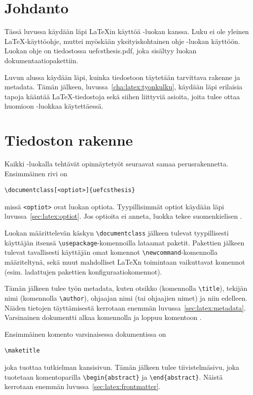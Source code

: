 
\chapter{Johdanto}
\label{cha:latex:johdanto}

Tässä luvussa käydään läpi \LaTeX{in} käyttöä \uefcsthesis-luokan kanssa. Luku ei ole yleinen \LaTeX-käyttöohje, muttei myöskään yksityiskohtainen ohje \uefcsthesis-luokan käyttöön. Luokan ohje on tiedostossa uefcsthesis.pdf, joka sisältyy luokan dokumentaatiopakettiin.

Luvun alussa käydään läpi, kuinka tiedostoon täytetään tarvittava rakenne ja metadata. Tämän jälkeen, luvussa~\ref{cha:latex:tyonkulku}, käydään läpi erilaisia tapoja kääntää \LaTeX-tiedostoja sekä siihen liittyviä asioita, joita tulee ottaa huomioon \uefcsthesis-luokkaa käytettäessä. 

\chapter{Tiedoston rakenne}
\label{cha:latex:rakenne}

Kaikki \uefcsthesis-luokalla tehtävät opinnäytetyöt seuraavat samaa perusrakennetta. Ensimmäinen rivi on 
\begin{verbatim}
\documentclass[<optiot>]{uefcsthesis}
\end{verbatim}
missä \verb|<optiot>| ovat luokan optiota. Tyypillisimmät optiot käydään läpi luvussa~\ref{sec:latex:optiot}. Jos optioita ei anneta, luokka tekee suomenkielisen . 

Luokan määrittelevän käskyn \verb|\documentclass| jälkeen tulevat tyypillisesti käyttäjän itsensä \verb|\usepackage|-komennoilla lataamat paketit. Pakettien jälkeen tulevat tavallisesti käyttäjän omat komennot \verb|\newcommand|-komennolla määriteltynä, sekä muut mahdolliset \LaTeX{n} toimintaan vaikuttavat komennot (esim. ladattujen pakettien konfiguraatiokomennot).

Tämän jälkeen tulee työn metadata, kuten otsikko (komennolla \verb|\title|), tekijän nimi (komennolla \verb|\author|), ohjaajan nimi (tai ohjaajien nimet) ja niin edelleen. Näiden tietojen täyttämisestä kerrotaan enemmän luvussa~\ref{sec:latex:metadata}. Varsinainen dokumentti alkaa komennolla \verb|| ja loppuu komentoon \verb||.

Ensimmäinen komento varsinaisessa dokumentissa on
\begin{verbatim}
\maketitle
\end{verbatim}
joka tuottaa tutkielman kansisivun. Tämän jälkeen tulee tiivistelmäsivu, joka tuotetaan komentoparilla \verb|\begin{abstract}| ja \verb|\end{abstract}|. Näistä kerrotaan enemmän luvussa~\ref{sec:latex:frontmatter}.

